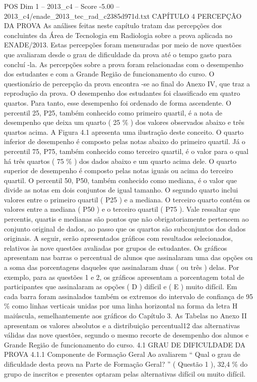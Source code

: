\begin{textsample}{POS Dim 1 – 2013\_c4 – Score -5.00 – 2013\_c4/enade\_2013\_tec\_rad\_c2385d971d.txt}  \label{ex:f1_pos_390}
CAPÍTULO 4 PERCEPÇÃO DA PROVA As análises feitas neste capítulo tratam das percepções dos concluintes da Área de Tecnologia em Radiologia sobre a prova aplicada no ENADE/2013.
Estas percepções foram mensuradas por meio de nove questões que avaliaram desde o grau de dificuldade da prova até o tempo gasto para concluí -la.
As percepções sobre a prova foram relacionadas com o desempenho dos estudantes e com a Grande Região de funcionamento do curso.
O questionário de percepção da prova encontra -se ao final do Anexo IV, que traz a reprodução da prova.
O desempenho dos estudantes foi classificado em quatro quartos.
Para tanto, esse desempenho foi ordenado de forma ascendente.
O percentil 25, P25, também conhecido como primeiro quartil, é a nota de desempenho que deixa um quarto ( 25 \% ) dos valores observados abaixo e três quartos acima.
A Figura 4.1 apresenta uma ilustração deste conceito.
O quarto inferior de desempenho é composto pelas notas abaixo do primeiro quartil.
Já o percentil 75, P75, também conhecido como terceiro quartil, é o valor para o qual há três quartos ( 75 \% ) dos dados abaixo e um quarto acima dele.
O quarto superior de desempenho é composto pelas notas iguais ou acima do terceiro quartil.
O percentil 50, P50, também conhecido como mediana, é o valor que divide as notas em dois conjuntos de igual tamanho.
O segundo quarto inclui valores entre o primeiro quartil ( P25 ) e a mediana.
O terceiro quarto contém os valores entre a mediana ( P50 ) e o terceiro quartil ( P75 ).
Vale ressaltar que percentis, quartis e medianas são pontos que não obrigatoriamente pertencem ao conjunto original de dados, ao passo que os quartos são subconjuntos dos dados originais.
A seguir, serão apresentados gráficos com resultados selecionados, relativos às nove questões avaliadas por grupos de estudantes.
Os gráficos apresentam nas barras o percentual de alunos que assinalaram uma das opções ou a soma das porcentagens daqueles que assinalaram duas ( ou três ) delas.
Por exemplo, para as questões 1 e 2, os gráficos apresentam a porcentagem total de participantes que assinalaram as opções ( D ) difícil e ( E ) muito difícil.
Em cada barra foram assinalados também os extremos do intervalo de confiança de 95 \% como linhas verticais unidas por uma linha horizontal na forma da letra H maiúscula, semelhantemente aos gráficos do Capítulo 3.
As Tabelas no Anexo II apresentam os valores absolutos e a distribuição percentual12 das alternativas válidas das nove questões, segundo o mesmo recorte de desempenho dos alunos e Grande Região de funcionamento do curso. 4.1 GRAU DE DIFICULDADE DA PROVA 4.1.1 Componente de Formação Geral Ao avaliarem “ Qual o grau de dificuldade desta prova na Parte de Formação Geral? ” ( Questão 1 ), 32,4 \% do grupo de inscritos e presentes optaram pelas alternativas difícil ou muito difícil.

\end{textsample}
